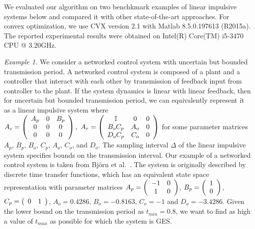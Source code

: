 




We evaluated our algorithm on two benchkmark examples of linear
impulsive systems below and compared it with other state-of-the-art
approaches.  For convex optimization, we use CVX version 2.1 with
Matlab 8.5.0.197613 (R2015a).  The reported experimental results were
obtained on Intel(R) Core(TM) i5-3470 CPU @ 3.20GHz.

\emph{Example 1.} We consider a networked control system with
uncertain but bounded transmission period.  A networked control system
is composed of a plant and a controller that interact with each other
by transmission of feedback input from controller to the plant.  If
the system dynamics is linear with linear feedback, then for uncertain
but bounded transmission period, we can equivalently represent it
as a linear impulsive system where $A_c=\left(\begin{array}{ccc} A_p & 0 & B_p\\ 0 & 0 &
  0\\ 0 & 0 & 0
\end{array}\right),~A_r=\left(\begin{array}{ccc}
\mathbb{I} & 0 & 0\\
B_oC_p & A_o & 0\\
D_oC_p & C_o & 0
\end{array}\right)$ for some parameter matrices $A_p$, $B_p$, $B_o$,
$C_p$, $A_o$, $C_o$, and $D_o$.  The sampling interval $\Delta$ of the
linear impulsive system specifies bounds on the transmission interval.
%
Our example of a networked control system is taken from Bj\"{o}rn et
al.~\cite{wittenmark2002computer}.  The system is originally described
by discrete time transfer functions, which has an equivalent state
space representation with parameter matrices
$A_p=\left(\begin{array}{cc}-1 & 0\\ 1 & 0\end{array}\right)$,
  $B_p=\left(\begin{array}{c}1\\ 0\end{array}\right)$,
    $C_p=\left(\begin{array}{cc}0 & 1\end{array}\right)$, $A_o=0.4286$,
      $B_o=-0.8163$, $C_o=-1$ and $D_o=-3.4286$.  Given the lower
      bound on the transmission period as $t_{min}=0.8$, we want to
      find as high a value of $t_{max}$ as possible for which the
      system is GES.

